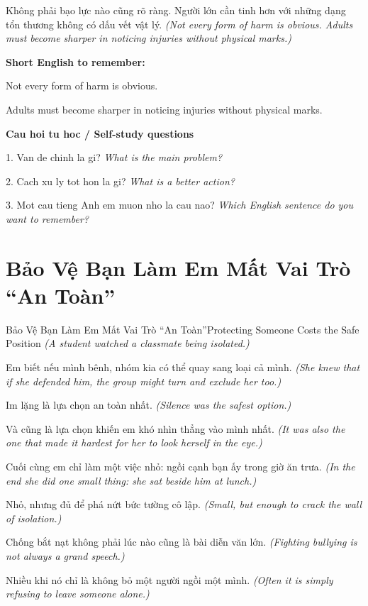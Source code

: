 \begin{baihoc}
Không phải bạo lực nào cũng rõ ràng. Người lớn cần tinh hơn với những dạng tổn thương không có dấu vết vật lý.
\textit{(Not every form of harm is obvious. Adults must become sharper in noticing injuries without physical marks.)}
\end{baihoc}

\begin{ghinhoanh}
\textbf{Short English to remember:}

Not every form of harm is obvious.

Adults must become sharper in noticing injuries without physical marks.

\end{ghinhoanh}

\begin{tuhocnhanh}
\textbf{Cau hoi tu hoc / Self-study questions}

1. Van de chinh la gi? \textit{What is the main problem?}

2. Cach xu ly tot hon la gi? \textit{What is a better action?}

3. Mot cau tieng Anh em muon nho la cau nao? \textit{Which English sentence do you want to remember?}
\end{tuhocnhanh}
\ngancach

\section{Bảo Vệ Bạn Làm Em Mất Vai Trò “An Toàn”}
\begin{truyen}{Bảo Vệ Bạn Làm Em Mất Vai Trò “An Toàn”}{Protecting Someone Costs the Safe Position}
\textit{(A student watched a classmate being isolated.)}

Em biết nếu mình bênh, nhóm kia có thể quay sang loại cả mình.
\textit{(She knew that if she defended him, the group might turn and exclude her too.)}

Im lặng là lựa chọn an toàn nhất.
\textit{(Silence was the safest option.)}

Và cũng là lựa chọn khiến em khó nhìn thẳng vào mình nhất.
\textit{(It was also the one that made it hardest for her to look herself in the eye.)}

Cuối cùng em chỉ làm một việc nhỏ: ngồi cạnh bạn ấy trong giờ ăn trưa.
\textit{(In the end she did one small thing: she sat beside him at lunch.)}

Nhỏ, nhưng đủ để phá nứt bức tường cô lập.
\textit{(Small, but enough to crack the wall of isolation.)}

Chống bắt nạt không phải lúc nào cũng là bài diễn văn lớn.
\textit{(Fighting bullying is not always a grand speech.)}

Nhiều khi nó chỉ là không bỏ một người ngồi một mình.
\textit{(Often it is simply refusing to leave someone alone.)}

\end{truyen}

